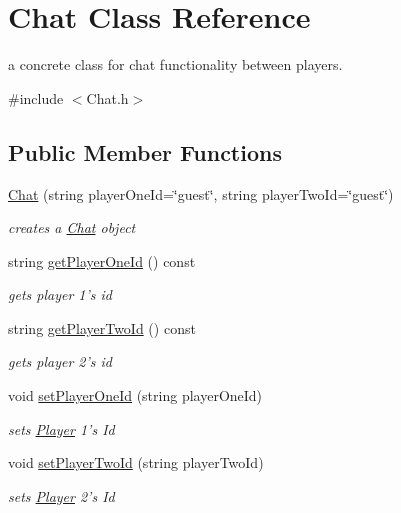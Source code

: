 \hypertarget{classChat}{
\section{Chat Class Reference}
\label{classChat}
}


a concrete class for chat functionality between players.  


{\ttfamily \#include $<$Chat.h$>$}\subsection*{Public Member Functions}
\begin{DoxyCompactItemize}
\item 
\hyperlink{classChat_abc23d9c9b254089b8f486bd0ef6bc225}{Chat} (string playerOneId=\char`\"{}guest\char`\"{}, string playerTwoId=\char`\"{}guest\char`\"{})
\begin{DoxyCompactList}\small\item\em creates a \hyperlink{classChat}{Chat} object \item\end{DoxyCompactList}\item 
string \hyperlink{classChat_add2a099a2c259d0a4a7e88061a3ac7df}{getPlayerOneId} () const 
\begin{DoxyCompactList}\small\item\em gets player 1's id \item\end{DoxyCompactList}\item 
string \hyperlink{classChat_a017261b95b8794213381c1534881968b}{getPlayerTwoId} () const 
\begin{DoxyCompactList}\small\item\em gets player 2's id \item\end{DoxyCompactList}\item 
void \hyperlink{classChat_adbe497560146ca9d5a940792b407f9fc}{setPlayerOneId} (string playerOneId)
\begin{DoxyCompactList}\small\item\em sets \hyperlink{classPlayer}{Player} 1's Id \item\end{DoxyCompactList}\item 
void \hyperlink{classChat_ae81fb0422bd13afef5a18836d6c24a78}{setPlayerTwoId} (string playerTwoId)
\begin{DoxyCompactList}\small\item\em sets \hyperlink{classPlayer}{Player} 2's Id \item\end{DoxyCompactList}\item 

\end{DoxyCompactItemize}
